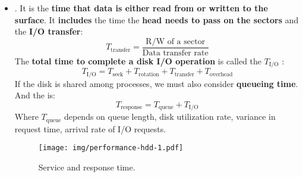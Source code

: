 \begin{itemize}
    \item {}. It is the \textbf{time that data is either read from or written to the surface}. It \textbf{includes} the time the \textbf{head needs to pass on the sectors} and the \textbf{I/O transfer}:
    \begin{equation}
        T_{\text{transfer}} = \dfrac{\text{R/W of a sector}}{\text{Data transfer rate}}
    \end{equation}
    The \textbf{total time to complete a disk I/O operation} is called the $T_{\text{I/O}}$ :
    \begin{equation}\label{eq: Service Time}
        T_{\text{I/O}} = T_{\text{seek}} + T_{\text{rotation}} + T_{\text{transfer}} + T_{\text{overhead}}
    \end{equation}
    If the disk is shared among processes, we must also consider \textbf{queueing time}. And the  is:
    \begin{equation}
        T_{\text{response}} = T_{\text{queue}} + T_{\text{I/O}}
    \end{equation}
    Where $T_{\text{queue}}$ depends on queue length, disk utilization rate, variance in request time, arrival rate of I/O requests.
    \newpage
    \begin{figure}[!htp]
        \centering
        \texttt{[image: img/performance-hdd-1.pdf]}
        \caption{Service and response time.}
    \end{figure}
\end{itemize}

